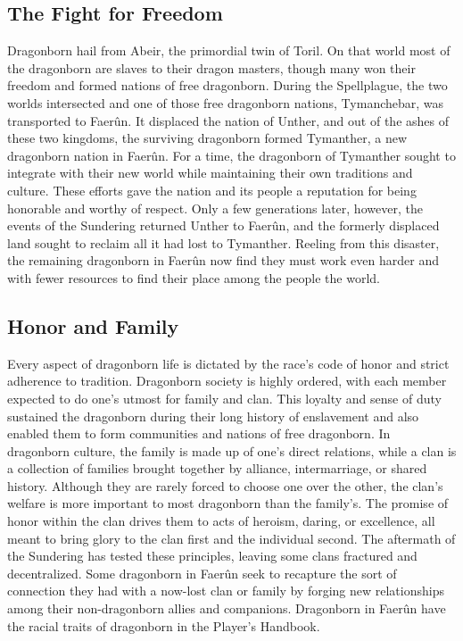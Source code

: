 \documentclass[10pt,a4paper,twoside,twocolumn,openany,bg=print,nodeprecatedcode]{dndbook}
\begin{document}
\subsection{The Fight for Freedom}
Dragonborn hail from Abeir, the primordial twin of Toril. On that world most of the dragonborn are slaves to their dragon masters, though many won their freedom and formed nations of free dragonborn. During the Spellplague, the two worlds intersected and one of those free dragonborn nations, Tymanchebar, was transported to Faerûn. It displaced the nation of Unther, and out of the ashes of these two kingdoms, the surviving dragonborn formed Tymanther, a new dragonborn nation in Faerûn.
For a time, the dragonborn of Tymanther sought to integrate with their new world while maintaining their own traditions and culture. These efforts gave the nation and its people a reputation for being honorable and worthy of respect. Only a few generations later, however, the events of the Sundering returned Unther to Faerûn, and the formerly displaced land sought to reclaim all it had lost to Tymanther. Reeling from this disaster, the remaining dragonborn in Faerûn now find they must work even harder and with fewer resources to find their place among the people the world.
\subsection{Honor and Family}
Every aspect of dragonborn life is dictated by the race's code of honor and strict adherence to tradition. Dragonborn society is highly ordered, with each member expected to do one's utmost for family and clan. This loyalty and sense of duty sustained the dragonborn during their long history of enslavement and also enabled them to form communities and nations of free dragonborn.
In dragonborn culture, the family is made up of one's direct relations, while a clan is a collection of families brought together by alliance, intermarriage, or shared history. Although they are rarely forced to choose one over the other, the clan's welfare is more important to most dragonborn than the family's. The promise of honor within the clan drives them to acts of heroism, daring, or excellence, all meant to bring glory to the clan first and the individual second.
The aftermath of the Sundering has tested these principles, leaving some clans fractured and decentralized. Some dragonborn in Faerûn seek to recapture the sort of connection they had with a now-lost clan or family by forging new relationships among their non-dragonborn allies and companions.
Dragonborn in Faerûn have the racial traits of dragonborn in the Player's Handbook.
\end{document}
